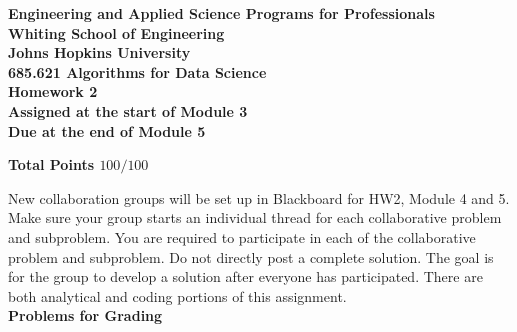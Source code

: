 \documentclass{article}
\begin{document}
\begin{center}
\bfseries Engineering and Applied Science Programs for Professionals \\
Whiting School of Engineering \\
Johns Hopkins University \\
685.621 Algorithms for Data Science \\
Homework 2 \\
Assigned at the start of Module 3 \\
Due at the end of Module 5
\end{center}

\begin{center}
\bfseries Total Points $100/100$
\end{center}

New collaboration groups will be set up in Blackboard for HW2, Module 4 and 5. Make sure your group starts an individual thread for each collaborative problem and subproblem. You are required to participate in each of the collaborative problem and subproblem. Do not directly post a complete solution. The goal is for the group to develop a solution after everyone has participated. There are both analytical and coding portions of this assignment.\\


\textbf{Problems for Grading}
\end{document}
